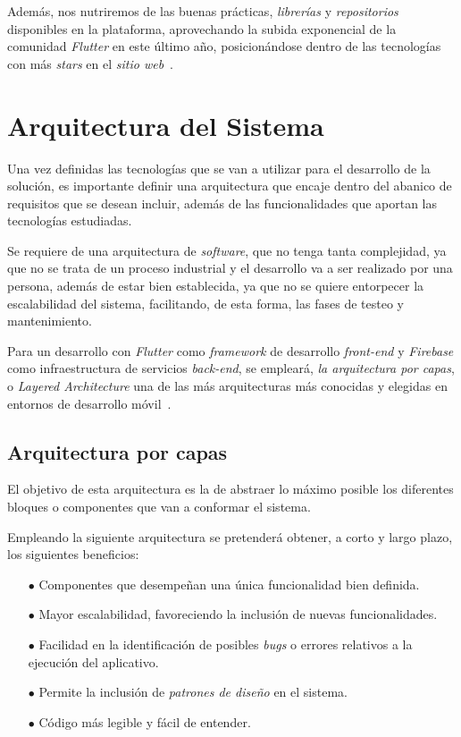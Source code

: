 Además, nos nutriremos de las buenas prácticas, \textit{librerías} y \textit{repositorios} disponibles en la plataforma,
aprovechando la subida exponencial de la comunidad \textit{Flutter} en este último año, posicionándose
dentro de las tecnologías con más \textit{stars} en el \textit{sitio web}~\cite{gittracker}.

\section{Arquitectura del Sistema}
Una vez definidas las tecnologías que se van a utilizar para el desarrollo de la solución, es importante definir una 
arquitectura que encaje dentro del abanico de requisitos que se desean incluir, además de las funcionalidades que
aportan las tecnologías estudiadas.

Se requiere de una arquitectura de \textit{software}, que no tenga tanta complejidad, ya que no se trata de un
proceso industrial y el desarrollo va a ser realizado por una persona, además de estar bien establecida, ya que
no se quiere entorpecer la escalabilidad del sistema, facilitando, de esta forma, las fases de testeo y mantenimiento.

Para un desarrollo con \textit{Flutter} como \textit{framework} de desarrollo \textit{front-end} y \textit{Firebase}
como infraestructura de servicios \textit{back-end}, se empleará, \textit{la arquitectura por capas}, o 
\textit{Layered Architecture} 
una de las más arquitecturas más conocidas y elegidas en entornos de desarrollo móvil~\cite{7053865}.

\subsection{Arquitectura por capas}
El objetivo de esta arquitectura es la de abstraer lo máximo posible los diferentes bloques o componentes que van a
conformar el sistema. 

Empleando la siguiente arquitectura se pretenderá obtener, a corto y largo plazo,  los siguientes beneficios:

\begin{itemize}
  \item[$\bullet$] Componentes que desempeñan una única funcionalidad bien definida.
  \item[$\bullet$] Mayor escalabilidad, favoreciendo la inclusión de nuevas funcionalidades.
  \item[$\bullet$] Facilidad en la identificación de posibles \textit{bugs} o errores relativos a la
  ejecución del aplicativo.
  \item[$\bullet$] Permite la inclusión de \textit{patrones de diseño} en el sistema.
  \item[$\bullet$] Código más legible y fácil de entender.
\end{itemize}

